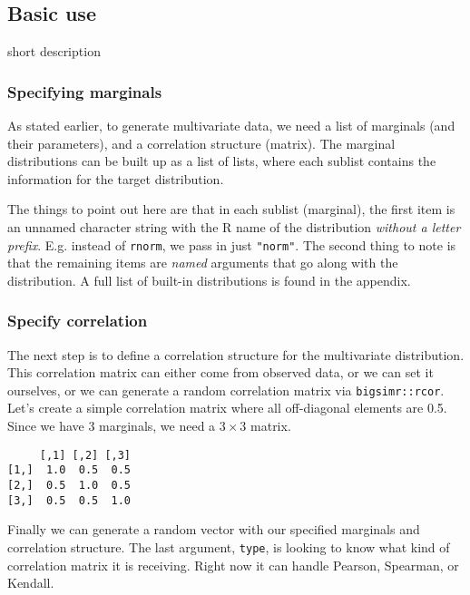 \documentclass[
]{article}
\begin{document}
\hypertarget{basic-use}{%
\subsection{Basic use}\label{basic-use}}

short description

\hypertarget{specifying-marginals}{%
\subsubsection{Specifying marginals}\label{specifying-marginals}}

As stated earlier, to generate multivariate data, we need a list of marginals (and their parameters), and a correlation structure (matrix). The marginal distributions can be built up as a list of lists, where each sublist contains the information for the target distribution.

The things to point out here are that in each sublist (marginal), the first item is an unnamed character string with the R name of the distribution \emph{without a letter prefix}. E.g. instead of \texttt{rnorm}, we pass in just \texttt{"norm"}. The second thing to note is that the remaining items are \emph{named} arguments that go along with the distribution. A full list of built-in distributions is found in the appendix.

\hypertarget{specify-correlation}{%
\subsubsection{Specify correlation}\label{specify-correlation}}

The next step is to define a correlation structure for the multivariate distribution. This correlation matrix can either come from observed data, or we can set it ourselves, or we can generate a random correlation matrix via \texttt{bigsimr::rcor}. Let's create a simple correlation matrix where all off-diagonal elements are 0.5. Since we have 3 marginals, we need a \(3\times 3\) matrix.

\begin{verbatim}
     [,1] [,2] [,3]
[1,]  1.0  0.5  0.5
[2,]  0.5  1.0  0.5
[3,]  0.5  0.5  1.0
\end{verbatim}

Finally we can generate a random vector with our specified marginals and correlation structure. The last argument, \texttt{type}, is looking to know what kind of correlation matrix it is receiving. Right now it can handle Pearson, Spearman, or Kendall.
\end{document}
